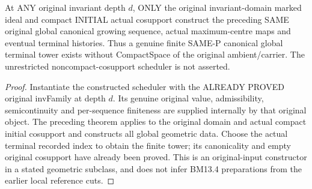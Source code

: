 \begin{theorem}
\label{hir:original-all-depth-compact-cosupport-global-scheduler}
\leanok
At ANY original invariant depth $d$, ONLY the original invariant-domain marked
ideal and compact INITIAL actual cosupport construct the preceding SAME
original global canonical growing sequence, actual maximum-centre maps and
eventual terminal histories. Thus a genuine finite SAME-P canonical global
terminal tower exists without CompactSpace of the original ambient/carrier.
The unrestricted noncompact-cosupport scheduler is not asserted.
\end{theorem}
\begin{proof}
Instantiate the constructed scheduler with the ALREADY PROVED original
invFamily at depth $d$. Its genuine original value, admissibility,
semicontinuity and per-sequence finiteness are supplied internally by that
original object. The preceding theorem applies to the original domain and
actual compact initial cosupport and constructs all global geometric data.
Choose the actual terminal recorded index to obtain the finite tower;
its canonicality and empty original cosupport have already been proved.
This is an original-input constructor in a stated geometric subclass, and
does not infer BM13.4 preparations from the earlier local reference cuts.
\end{proof}
